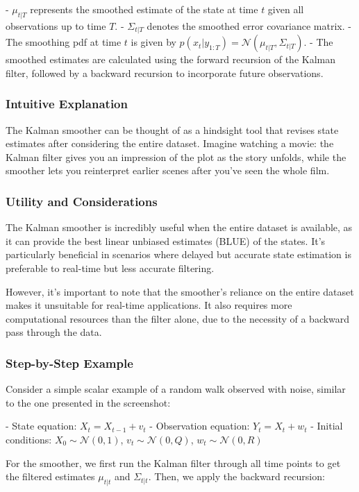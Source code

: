 \documentclass{article}
\begin{document}
- \(\mu_{t|T}\) represents the smoothed estimate of the state at time \(t\) given all observations up to time \(T\).
- \(\Sigma_{t|T}\) denotes the smoothed error covariance matrix.
- The smoothing pdf at time \(t\) is given by \(p(x_t|y_{1:T}) = \mathcal{N}(\mu_{t|T}, \Sigma_{t|T})\).
- The smoothed estimates are calculated using the forward recursion of the Kalman filter, followed by a backward recursion to incorporate future observations.

\subsubsection{Intuitive Explanation}
The Kalman smoother can be thought of as a hindsight tool that revises state estimates after considering the entire dataset. Imagine watching a movie: the Kalman filter gives you an impression of the plot as the story unfolds, while the smoother lets you reinterpret earlier scenes after you’ve seen the whole film.

\subsubsection{Utility and Considerations}
The Kalman smoother is incredibly useful when the entire dataset is available, as it can provide the best linear unbiased estimates (BLUE) of the states. It's particularly beneficial in scenarios where delayed but accurate state estimation is preferable to real-time but less accurate filtering.

However, it's important to note that the smoother's reliance on the entire dataset makes it unsuitable for real-time applications. It also requires more computational resources than the filter alone, due to the necessity of a backward pass through the data.

\subsubsection{Step-by-Step Example}
Consider a simple scalar example of a random walk observed with noise, similar to the one presented in the screenshot:

- State equation: \(X_t = X_{t-1} + v_t\)
- Observation equation: \(Y_t = X_t + w_t\)
- Initial conditions: \(X_0 \sim \mathcal{N}(0,1)\), \(v_t \sim \mathcal{N}(0,Q)\), \(w_t \sim \mathcal{N}(0,R)\)

For the smoother, we first run the Kalman filter through all time points to get the filtered estimates \(\mu_{t|t}\) and \(\Sigma_{t|t}\). Then, we apply the backward recursion:
\end{document}
